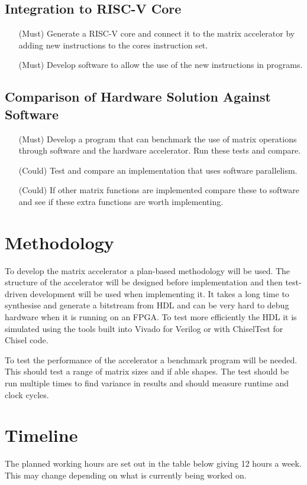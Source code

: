 \documentclass[a4paper,fleqn,12pt]{article}
\begin{document}
	\subsection{Integration to RISC-V Core}
	\begin{enumerate}
		\item [(Must)] Generate a RISC-V core and connect it to the matrix accelerator by adding new instructions to the cores instruction set.
		\item [(Must)] Develop software to allow the use of the new instructions in programs.
	\end{enumerate}
	\subsection{Comparison of Hardware Solution Against Software}
	\begin{enumerate}
		\item [(Must)] Develop a program that can benchmark the use of matrix operations through software and the hardware accelerator. Run these tests and compare.
		\item [(Could)] Test and compare an implementation that uses software parallelism.
		\item [(Could)] If other matrix functions are implemented compare these to software and see if these extra functions are worth implementing.
	\end{enumerate}
			
  	\newpage			
	\section{Methodology}
	To develop the matrix accelerator a plan-based methodology will be used. The structure of the accelerator will be designed before implementation and then test-driven development will be used when implementing it. It takes a long time to synthesise and generate a bitstream from HDL and can be very hard to debug hardware when it is running on an FPGA. To test more efficiently the HDL it is simulated using the tools built into Vivado for Verilog or with ChiselTest for Chisel code.
	
	To test the performance of the accelerator a benchmark program will be needed. This should test a range of matrix sizes and if able shapes. The test should be run multiple times to find variance in results and should measure runtime and clock cycles.
	
	\section{Timeline}
	The planned working hours are set out in the table below giving 12 hours a week. This may change depending on what is currently being worked on.
	
\end{document}
